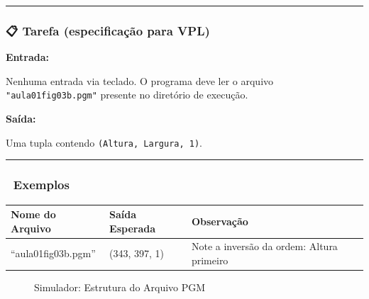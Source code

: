 \documentclass[
  portuguese,
  letterpaper,
  openany,
  oneside,
  12pt,
  a4paper]{book}
\begin{document}
\begin{center}\rule{0.5\linewidth}{0.5pt}\end{center}

\subsubsection{📋 Tarefa (especificação para
VPL)}\label{tarefa-especificauxe7uxe3o-para-vpl-7}

\textbf{Entrada:}

Nenhuma entrada via teclado. O programa deve ler o arquivo
\texttt{"aula01fig03b.pgm"} presente no diretório de execução.

\textbf{Saída:}

Uma tupla contendo \texttt{(Altura,\ Largura,\ 1)}.

\begin{center}\rule{0.5\linewidth}{0.5pt}\end{center}

\subsubsection{📌 Exemplos}\label{exemplos-7}

\begin{longtable}[]{@{}
  >{\raggedright\arraybackslash}p{}
  >{\raggedright\arraybackslash}p{}
  >{\raggedright\arraybackslash}p{}@{}}
\toprule\noalign{}
\begin{minipage}[b]{\linewidth}\raggedright
Nome do Arquivo
\end{minipage} & \begin{minipage}[b]{\linewidth}\raggedright
Saída Esperada
\end{minipage} & \begin{minipage}[b]{\linewidth}\raggedright
Observação
\end{minipage} \\
\midrule\noalign{}
\endhead
\bottomrule\noalign{}
\endlastfoot
``aula01fig03b.pgm'' & (343, 397, 1) & Note a inversão da ordem: Altura
primeiro \\
\end{longtable}

\begin{figure}


\caption{\label{fig-01-estrutura-pgm}Simulador: Estrutura do Arquivo
PGM}

\end{figure}%
\end{document}
